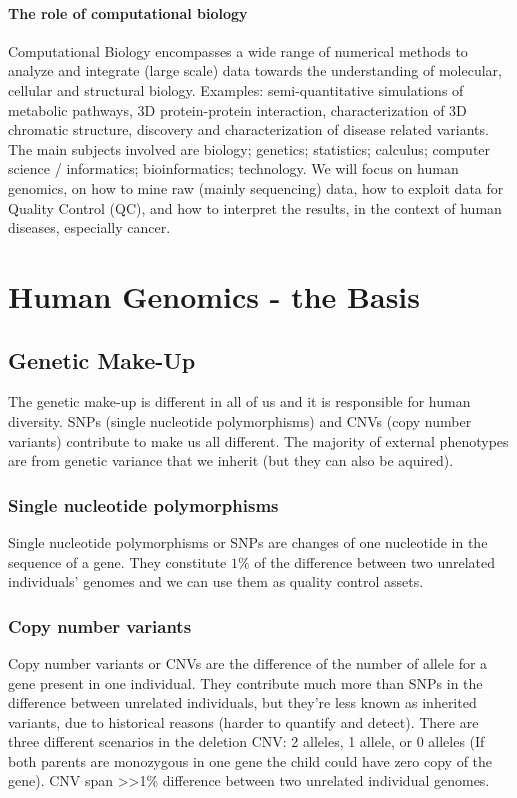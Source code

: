 	\paragraph*{The role of computational biology}
	Computational Biology encompasses a wide range of numerical methods to analyze and integrate (large scale) data towards the understanding of molecular, cellular and structural biology. Examples: semi-quantitative simulations of metabolic pathways, 3D protein-protein interaction, characterization of 3D chromatic structure, discovery and characterization of disease related variants. The main subjects involved are biology; genetics; statistics; calculus; computer science / informatics; bioinformatics; technology.
We will focus on human genomics, on how to mine raw (mainly sequencing) data, how to exploit data for Quality Control (QC), and how to interpret the results, in the context of human diseases, especially cancer.

\section{Human Genomics - the Basis}
\subsection{Genetic Make-Up}
The genetic make-up is different in all of us and it is responsible for human diversity.
SNPs (single nucleotide polymorphisms) and CNVs (copy number variants) contribute to make us all different.
The majority of external phenotypes are from genetic variance that we inherit (but they can also be aquired).

		\subsubsection{Single nucleotide polymorphisms}
		Single nucleotide polymorphisms or SNPs are changes of one nucleotide in the sequence of a gene.
		They constitute $1\%$ of the difference between two unrelated individuals' genomes and we can use them as quality control assets.

		\subsubsection{Copy number variants}
		Copy number variants or CNVs are the difference of the number of allele for a gene present in one individual.
		They contribute much more than SNPs in the difference between unrelated individuals, but they're less known as inherited variants, due to historical reasons (harder to quantify and detect).
		There are three different scenarios in the deletion CNV: 2 alleles, 1 allele, or 0 alleles (If both parents are monozygous in one gene the child could have zero copy of the gene).
		CNV span >>1\% difference between two unrelated individual genomes.

